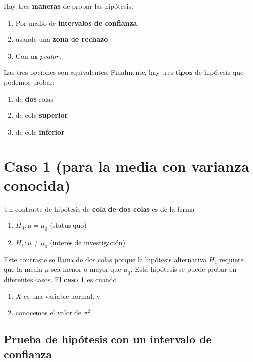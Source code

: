 \documentclass[
]{book}
\providecommand{\tightlist}{%
  \setlength{\itemsep}{0pt}\setlength{\parskip}{0pt}}
\begin{document}
Hay tres \textbf{maneras} de probar las hipótesis:

\begin{enumerate}
\def\labelenumi{\arabic{enumi}.}
\tightlist
\item
  Por medio de \textbf{intervalos de confianza}
\item
  usando una \textbf{zona de rechazo}
\item
  Con un \(pvalor\).
\end{enumerate}

Las tres opciones son equivalentes. Finalmente, hay tres \textbf{tipos} de hipótesis que podemos probar:

\begin{enumerate}
\def\labelenumi{\arabic{enumi}.}
\tightlist
\item
  de \textbf{dos} colas
\item
  de cola \textbf{superior}
\item
  de cola \textbf{inferior}
\end{enumerate}

\hypertarget{caso-1-para-la-media-con-varianza-conocida}{%
\section{Caso 1 (para la media con varianza conocida)}\label{caso-1-para-la-media-con-varianza-conocida}}

Un contraste de hipótesis de \textbf{cola de dos colas} es de la forma

\begin{enumerate}
\def\labelenumi{\alph{enumi}.}
\tightlist
\item
  \(H_0:\mu = \mu_0\) (status quo)
\item
  \(H_1:\mu \neq \mu_0\) (interés de investigación)
\end{enumerate}

Este contraste se llama de dos colas porque la hipótesis alternativa \(H_1\) requiere que la media \(\mu\) sea menor o mayor que \(\mu_0\). Esta hipótesis se puede probar en diferentes casos. El \textbf{caso 1} es cuando

\begin{enumerate}
\def\labelenumi{\arabic{enumi}.}
\tightlist
\item
  \(X\) es una variable normal, y
\item
  conocemos el valor de \(\sigma^2\)
\end{enumerate}

\hypertarget{prueba-de-hipuxf3tesis-con-un-intervalo-de-confianza}{%
\subsection{Prueba de hipótesis con un intervalo de confianza}\label{prueba-de-hipuxf3tesis-con-un-intervalo-de-confianza}}
\end{document}
